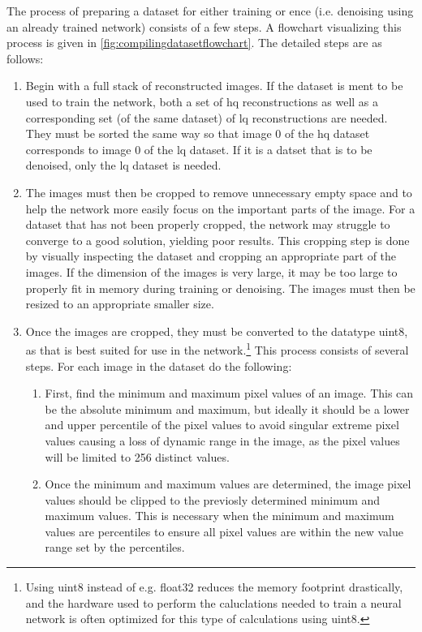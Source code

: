 The process of preparing a dataset for either training or ence (i.e. denoising using an already trained network) consists of a few steps. A flowchart visualizing this process is given in \cref{fig:compilingdatasetflowchart}. The detailed steps are as follows:

\begin{enumerate}
    \item Begin with a full stack of reconstructed images. If the dataset is ment to be used to train the network, both a set of \gls{hq} reconstructions as well as a corresponding set (of the same dataset) of \gls{lq} reconstructions are needed. They must be sorted the same way so that image 0 of the \gls{hq} dataset corresponds to image 0 of the \gls{lq} dataset. If it is a datset that is to be denoised, only the \gls{lq} dataset is needed. 
    \item The images must then be cropped to remove unnecessary empty space and to help the network more easily focus on the important parts of the image. For a dataset that has not been properly cropped, the network may struggle to converge to a good solution, yielding poor results. This cropping step is done by visually inspecting the dataset and cropping an appropriate part of the images. If the dimension of the images is very large, it may be too large to properly fit in memory during training or denoising. The images must then be resized to an appropriate smaller size. 
    \item Once the images are cropped, they must be converted to the datatype uint8, as that is best suited for use in the network.\footnote{Using uint8 instead of e.g. float32 reduces the memory footprint drastically, and the hardware used to perform the caluclations needed to train a neural network is often optimized for this type of calculations using uint8. } This process consists of several steps. For each image in the dataset do the following:
    \begin{enumerate}
        \item First, find the minimum and maximum pixel values of an image. This can be the absolute minimum and maximum, but ideally it should be a lower and upper percentile of the pixel values to avoid singular extreme pixel values causing a loss of dynamic range in the image, as the pixel values will be limited to 256 distinct values. 
        \item Once the minimum and maximum values are determined, the image pixel values should be clipped to the previosly determined minimum and maximum values. This is necessary when the minimum and maximum values are percentiles to ensure all pixel values are within the new value range set by the percentiles.

\end{enumerate}
\end{enumerate}
